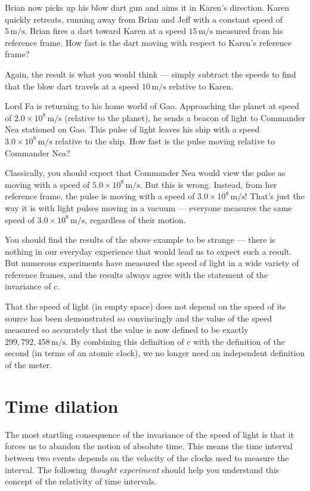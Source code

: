\begin{example}
  Brian now picks up his blow dart gun and aims it in Karen's
  direction.  Karen quickly retreats, running away from Brian and Jeff
  with a constant speed of $5\,\text{m/s}$.  Brian fires a dart toward Karen at
  a speed $15\,\text{m/s}$ measured from his reference frame.  How fast is the
  dart moving with respect to Karen's reference frame?  

\solution Again, the
  result is what you would think --- simply subtract the speeds to
  find that the blow dart travels at a speed $10\,\text{m/s}$ relative to Karen.
\end{example}

\begin{example}  
  Lord Fa is returning to his home world of Gao.  Approaching the
  planet at speed of $2.0\times 10^8\,\text{m/s}$ (relative to the planet), he
  sends a beacon of light to Commander Nea stationed on Gao.  This
  pulse of light leaves his ship with a speed $3.0\times 10^8\,\text{m/s}$
  relative to the ship.  How fast is the pulse moving relative to
  Commander Nea?  

\solution Classically, you should expect that
  Commander Nea would view the pulse as moving with a speed of
  $5.0\times 10^8\,\text{m/s}$.  But this is wrong.  Instead, from her
  reference frame, the pulse is moving with a speed of $3.0\times
  10^8\,\text{m/s}$!  That's just the way it is with light pulses moving in a
  vacuum --- everyone measures the same speed of $3.0\times 10^8\,\text{m/s}$,
  regardless of their motion.
\end{example}

You should find the results of the above example to be strange ---
there is nothing in our everyday experience that would lead us to
expect such a result.  But numerous experiments have measured the
speed of light in a wide variety of reference frames, and the
results always agree with the statement of the invariance of $c$.

That the speed of light (in empty space) does not depend on the speed
of its source has been demonstrated so convincingly and the value of
the speed measured so accurately that the value is now defined to be
exactly $299,792,458\,\text{m/s}$. By combining this definition of $c$ with the
definition of the second (in terms of an atomic clock), we no longer
need an independent definition of the meter.

\section{Time dilation}
\label{sec:time-dilation}
The most startling consequence of the invariance of the speed of light
is that it forces us to abandon the notion of absolute time.  This
means the time interval between two events depends on the velocity of
the clocks used to measure the interval.  The following \emph{thought
  experiment} should help you understand this concept of the
relativity of time intervals.
   
